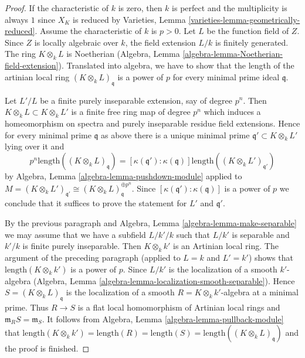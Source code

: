 \begin{proof}
If the characteristic of $k$ is zero, then $k$ is perfect and
the multiplicity is always $1$ since $X_K$ is reduced by
Varieties, Lemma \ref{varieties-lemma-geometrically-reduced}.
Assume the characteristic of $k$ is $p > 0$.
Let $L$ be the function field of $Z$. Since $Z$ is locally algebraic
over $k$, the field extension $L/k$ is finitely generated.
The ring $K \otimes_k L$ is Noetherian
(Algebra, Lemma \ref{algebra-lemma-Noetherian-field-extension}).
Translated into algebra, we have to show that the length of the
artinian local ring $(K \otimes_k L)_\mathfrak q$
is a power of $p$ for every minimal prime ideal $\mathfrak q$.

\medskip\noindent
Let $L'/L$ be a finite purely inseparable extension, say of degree
$p^n$. Then $K \otimes_k L \subset K \otimes_k L'$ is a finite
free ring map of degree $p^n$ which induces a homeomorphism on
spectra and purely inseparable residue field extensions.
Hence for every minimal prime $\mathfrak q$ as above
there is a unique minimal prime
$\mathfrak q' \subset K \otimes_k L'$ lying over it and
$$
p^n \text{length}((K \otimes_k L)_\mathfrak q) =
[\kappa(\mathfrak q') : \kappa(\mathfrak q)]
\text{length}((K \otimes_k L')_{\mathfrak q'})
$$
by Algebra, Lemma \ref{algebra-lemma-pushdown-module} applied
to $M = (K \otimes_k L')_{\mathfrak q'} \cong
(K \otimes_k L)_{\mathfrak q}^{\oplus p^n}$.
Since $[\kappa(\mathfrak q') : \kappa(\mathfrak q)]$ is a power
of $p$ we conclude that it suffices to prove the
statement for $L'$ and $\mathfrak q'$.

\medskip\noindent
By the previous paragraph and Algebra, Lemma \ref{algebra-lemma-make-separable}
we may assume that we have a subfield $L/k'/k$ such that $L/k'$ is separable
and $k'/k$ is finite purely inseparable. Then $K \otimes_k k'$ is an
Artinian local ring. The argument of the preceding paragraph
(applied to $L = k$ and $L' = k'$) shows that $\text{length}(K \otimes_k k')$
is a power of $p$. Since $L/k'$ is the localization of a
smooth $k'$-algebra
(Algebra, Lemma \ref{algebra-lemma-localization-smooth-separable}).
Hence $S = (K \otimes_k L)_\mathfrak q$ is the localization of a smooth
$R = K \otimes_k k'$-algebra at a minimal prime.
Thus $R \to S$ is a flat local homomorphism of Artinian
local rings and $\mathfrak m_R S = \mathfrak m_S$. It
follows from Algebra, Lemma \ref{algebra-lemma-pullback-module} that
$\text{length}(K \otimes_k k') = \text{length}(R) =
\text{length}(S) = \text{length}((K \otimes_k L)_\mathfrak q)$
and the proof is finished.
\end{proof}


